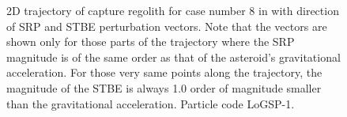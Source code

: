 \begin{figure}[htb]
\caption{2D trajectory of capture regolith for case number 8 in  with direction of \gls{SRP} and \gls{STBE} perturbation vectors. Note that the vectors are shown only for those parts of the trajectory where the \gls{SRP} magnitude is of the same order as that of the asteroid's gravitational acceleration. For those very same points along the trajectory, the magnitude of the \gls{STBE} is always 1.0 order of magnitude smaller than the gravitational acceleration. Particle code LoGSP-1.}
\label{fig:LoGSP_1_capture_case_8_2d_trajectory_perturbationVectors}
\end{figure}
\FloatBarrier
